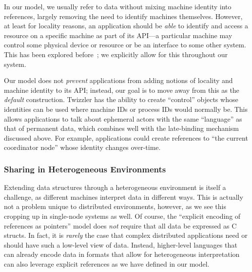 In our model, we usually refer to data without mixing machine identity into references,
largely removing the need to identify machines themselves.
However, at least for locality reasons,
an application should be \emph{able} to identify and access a resource on a
specific machine as part of its API---a particular
machine may control some physical device or resource or be an interface to some other system. This
has been explored before~\cite{ousterhout:computer88,grapevine}; we explicitly allow for this
throughout our system.

Our model does not \emph{prevent} applications from adding notions of locality and
machine identity to its API; instead, our goal is to move away from this as the \emph{default}
construction.
Twizzler has the ability to create ``control'' objects whose identities can be used
where machine IDs or process IDs would normally be. This allows applications to talk about ephemeral
actors with the same ``language'' as that of permanent data, which combines well with the
late-binding mechanism discussed above. For example, applications could create references to ``the
current coordinator node'' whose identity changes over-time.

\subsubsection{Sharing in Heterogeneous Environments}

Extending data structures through a heterogeneous environment is itself a challenge, as different
machines interpret data in different ways. This is actually not a problem unique to distributed
environments, however, as we see this cropping up in single-node systems as well. Of course, the
``explicit encoding of references as pointers'' model does \emph{not} require that all data be
expressed as C structs. In fact, it is \emph{rarely} the case that complex distributed applications
need or should have such a low-level view of data. Instead, higher-level languages that can already
encode data in formats that allow for heterogeneous interpretation can also leverage explicit
references as we have defined in our model.


